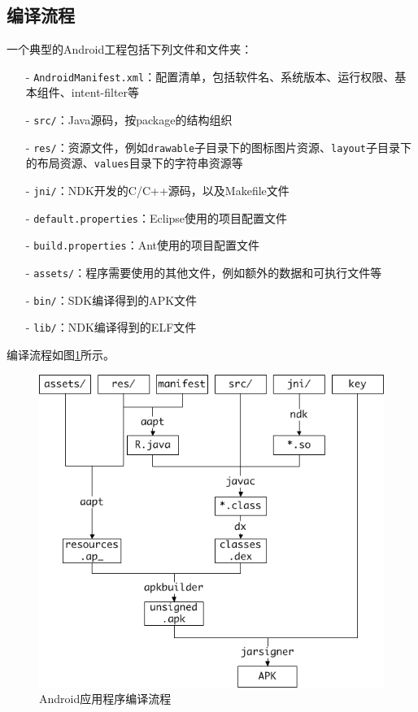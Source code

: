\subsection{编译流程}
一个典型的Android工程包括下列文件和文件夹：
\begin{itemize}
  \item[-] \lstinline!AndroidManifest.xml!：配置清单，包括软件名、系统版本、运行权限、基本组件、intent-filter等
  \item[-] \lstinline!src/!：Java源码，按package的结构组织
  \item[-] \lstinline!res/!：资源文件，例如\lstinline!drawable!子目录下的图标图片资源、\lstinline!layout!子目录下的布局资源、\lstinline!values!目录下的字符串资源等
  \item[-] \lstinline!jni/!：NDK开发的C/C++源码，以及Makefile文件
  \item[-] \lstinline!default.properties!：Eclipse使用的项目配置文件
  \item[-] \lstinline!build.properties!：Ant使用的项目配置文件
  \item[-] \lstinline!assets/!：程序需要使用的其他文件，例如额外的数据和可执行文件等
  \item[-] \lstinline!bin/!：SDK编译得到的APK文件
  \item[-] \lstinline!lib/!：NDK编译得到的ELF文件
\end{itemize}

编译流程如图\ref{Fig:compilation}所示。
\begin{figure}[htb]
  \centering
  \includegraphics[width=12cm]{image/compilation.png}
  \caption{Android应用程序编译流程}
  \label{Fig:compilation}
\end{figure}

